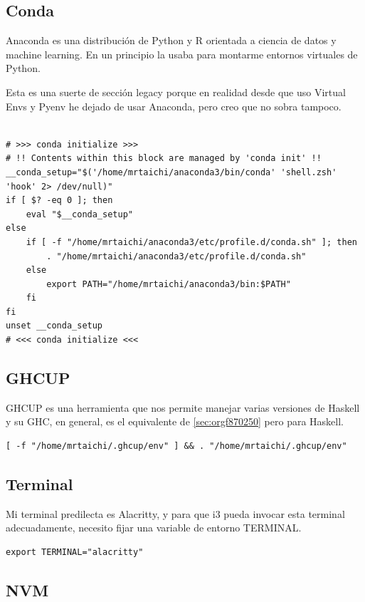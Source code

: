 \documentclass[11pt]{article}
\begin{document}
\subsection{Conda}
\label{sec:org9c758a0}

Anaconda es una distribución de Python y R orientada a ciencia de datos y machine learning. En un principio la usaba para montarme entornos virtuales de Python.

Esta es una suerte de sección legacy porque en realidad desde que uso Virtual Envs y Pyenv he dejado de usar Anaconda, pero creo que no sobra tampoco.

\begin{verbatim}

# >>> conda initialize >>>
# !! Contents within this block are managed by 'conda init' !!
__conda_setup="$('/home/mrtaichi/anaconda3/bin/conda' 'shell.zsh' 'hook' 2> /dev/null)"
if [ $? -eq 0 ]; then
    eval "$__conda_setup"
else
    if [ -f "/home/mrtaichi/anaconda3/etc/profile.d/conda.sh" ]; then
        . "/home/mrtaichi/anaconda3/etc/profile.d/conda.sh"
    else
        export PATH="/home/mrtaichi/anaconda3/bin:$PATH"
    fi
fi
unset __conda_setup
# <<< conda initialize <<<

\end{verbatim}
\subsection{GHCUP}
\label{sec:org0f4612e}

GHCUP es una herramienta que nos permite manejar varias versiones de Haskell y su GHC, en general, es el equivalente de \ref{sec:orgf870250} pero para Haskell.

\begin{verbatim}
[ -f "/home/mrtaichi/.ghcup/env" ] && . "/home/mrtaichi/.ghcup/env"
\end{verbatim}
\subsection{Terminal}
\label{sec:orgbb77761}

Mi terminal predilecta es Alacritty, y para que i3 pueda invocar esta terminal adecuadamente, necesito fijar una variable de entorno TERMINAL.

\begin{verbatim}
export TERMINAL="alacritty"
\end{verbatim}
\subsection{NVM}
\label{sec:org11eb931}
\end{document}
